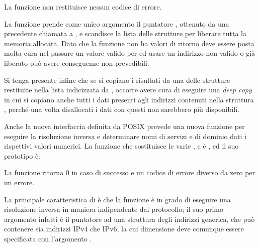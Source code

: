 \begin{funcproto}{
}

{La funzione non restituisce nessun codice di errore.}
\end{funcproto}

La funzione prende come unico argomento il puntatore , ottenuto da
una precedente chiamata a , e scandisce la lista delle
strutture per liberare tutta la memoria allocata. Dato che la funzione non ha
valori di ritorno deve essere posta molta cura nel passare un valore valido
per  ed usare un indirizzo non valido o già liberato può avere
conseguenze non prevedibili.

Si tenga presente infine che se si copiano i risultati da una delle strutture
 restituite nella lista indicizzata da , occorre
avere cura di eseguire una \textit{deep copy} in cui si copiano anche tutti i
dati presenti agli indirizzi contenuti nella struttura ,
perché una volta disallocati i dati con  questi non
sarebbero più disponibili.

Anche la nuova interfaccia definita da POSIX prevede una nuova funzione per
eseguire la risoluzione inversa e determinare nomi di servizi e di dominio
dati i rispettivi valori numerici. La funzione che sostituisce le varie
,  e  è
, ed il suo prototipo è:

\begin{funcproto}{
}

{La funzione ritorna $0$ in caso di successo e un codice di errore diverso da
  zero per un errore.}
\end{funcproto}

La principale caratteristica di  è che la funzione è in
grado di eseguire una risoluzione inversa in maniera indipendente dal
protocollo; il suo primo argomento  infatti è il puntatore ad una
struttura degli indirizzi generica, che può contenere sia indirizzi IPv4 che
IPv6, la cui dimensione deve comunque essere specificata con l'argomento
. 

